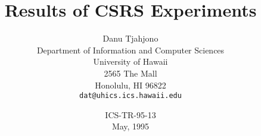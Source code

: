 



 

\title{Results of CSRS Experiments}
\author {Danu Tjahjono \\
         Department of Information and Computer Sciences \\
         University of Hawaii \\
         2565 The Mall\\
         Honolulu, HI 96822\\
         {\tt dat@uhics.ics.hawaii.edu}}

\date {ICS-TR-95-13\\ May, 1995}

\maketitle

\tableofcontents
\newpage




































































